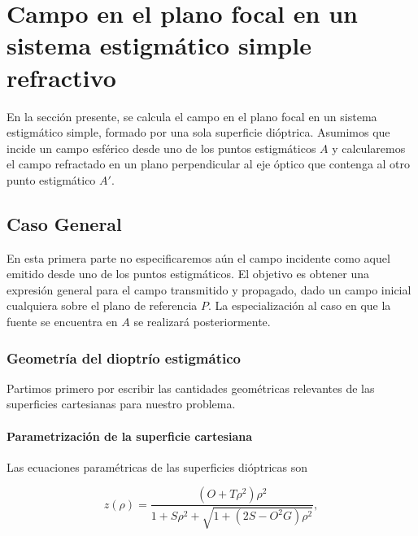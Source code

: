 \chapter{Campo en el plano focal en un sistema estigmático simple refractivo}

En la sección presente, se calcula el campo en el plano focal en un sistema estigmático simple, formado por una sola superficie dióptrica. Asumimos que incide un campo esférico desde uno de los puntos estigmáticos $A$ y calcularemos el campo refractado en un plano perpendicular al eje óptico que contenga al otro punto estigmático $A'$.

\section{Caso General}

En esta primera parte no especificaremos aún el campo incidente como aquel emitido desde uno de los puntos estigmáticos. El objetivo es obtener una expresión general para el campo transmitido y propagado, dado un campo inicial cualquiera sobre el plano de referencia $P$. La especialización al caso en que la fuente se encuentra en $A$ se realizará posteriormente.

\subsection{Geometría del dioptrío estigmático}

Partimos primero por escribir las cantidades geométricas relevantes de las superficies cartesianas para nuestro problema.

\subsubsection{Parametrización de la superficie cartesiana}

Las ecuaciones paramétricas de las superficies dióptricas son

\begin{equation}
  z(\rho)
  =
  \frac{(O + T\rho^2)\rho^2}
  {
  1 + S\rho^2 + \sqrt{1 + (2S - O^2G)\rho^2}
  },
  \label{eq:parametrical_ovoid_z_app}
\end{equation}

